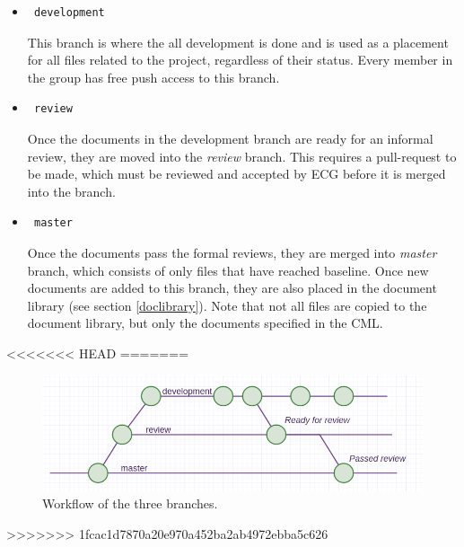 \documentclass{article}
\begin{document}
            \begin{itemize}
                \item \begin{verbatim} development \end{verbatim}
                This branch is where the all development is done and is used as a placement for all files related
                to the project, regardless of their status.
                Every member in the group has free push access to this branch.
                
                \item \begin{verbatim} review \end{verbatim}
                Once the documents in the development branch are ready for an informal review,  they are moved
                into the \textit{review} branch. This requires a pull-request to be made, which must be reviewed and accepted by ECG before it is merged into the branch. 
                
                \item \begin{verbatim} master \end{verbatim}
                Once the documents pass the formal reviews, they are merged into 
                \textit{master} branch, which consists of only files that have reached baseline.
                Once new documents are added to this branch, they are also placed in the document library (see section \ref{doclibrary}).
                Note that not all files are copied to the document library, but only the documents specified in the CML.
                
            \end{itemize}
<<<<<<< HEAD
=======
            
            \begin{figure}[h]
                \centering
                \includegraphics[width=\textwidth]{images/workflow.png}
                \caption{Workflow of the three branches.}
                \label{workflow}
            \end{figure}
>>>>>>> 1fcac1d7870a20e970a452ba2ab4972ebba5c626
        
\end{document}
